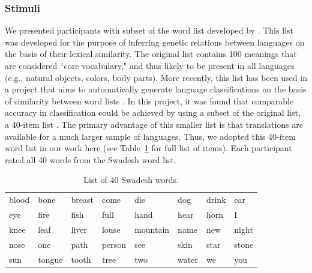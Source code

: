 \subsubsection{Stimuli}
We presented participants with subset of the word list developed by . This list was developed  for the purpose of inferring genetic relations between languages on the basis of their lexical similarity. The original list contains 100 meanings that are considered ``core vocabulary," and thus likely to be present in all languages (e.g., natural objects, colors, body parts). More recently, this list has been used in a project that aims to automatically generate language classifications on the basis of similarity between word lists \cite{brown2008automated}. In this project, it was found that comparable accuracy in classification could be achieved by using a subset of the original list, a 40-item list \cite{holman2008explorations}. The primary advantage of this smaller list is that translations are available for a much larger sample of languages. Thus, we adopted this 40-item word list in our work here (see Table~\ref{tab:swadeshwords} for full list of items). Each participant rated all 40 words from the  Swadesh word list. 

\begin{table}[t!]
\centering
\begin{tabular}{llllllll}
 \hline
blood  &  bone   &  breast   & come &    die    &  dog &     drink &  ear   \\
eye   &   fire   &  fish    & full   &  hand  &   hear &    horn  &   I  \\
knee  &   leaf   &  liver  &  louse  &  mountain  &name   &  new   &   night  \\
nose     &one    &  path     &person  & see    &  skin &    star  &   stone \\
sun  &    tongue  & tooth  & tree &    two      &water &   we    &   you     \\
 \hline
\end{tabular}
\caption{List of 40 Swadesh words.}
\label{tab:swadeshwords}
\end{table}

